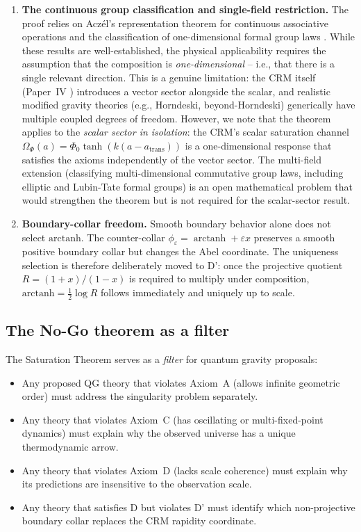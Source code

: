\documentclass[aps,prd,twocolumn,superscriptaddress,nofootinbib]{revtex4-2}
\begin{document}
\begin{enumerate}
\item \textbf{The continuous group classification and single-field restriction.} The proof relies on Acz\'el's representation theorem for continuous associative operations \cite{Aczel1966} and the classification of one-dimensional formal group laws \cite{Hazewinkel1978}. While these results are well-established, the physical applicability requires the assumption that the composition is \textit{one-dimensional} -- i.e., that there is a single relevant direction. This is a genuine limitation: the CRM itself (Paper~IV \cite{Geiger2026d}) introduces a vector sector alongside the scalar, and realistic modified gravity theories (e.g., Horndeski, beyond-Horndeski) generically have multiple coupled degrees of freedom. However, we note that the theorem applies to the \textit{scalar sector in isolation}: the CRM's scalar saturation channel $\Omega_\Phi(a) = \Phi_0 \tanh(k(a - a_{\mathrm{trans}}))$ is a one-dimensional response that satisfies the axioms independently of the vector sector. The multi-field extension (classifying multi-dimensional commutative group laws, including elliptic and Lubin-Tate formal groups) is an open mathematical problem that would strengthen the theorem but is not required for the scalar-sector result.

\item \textbf{Boundary-collar freedom.} Smooth boundary behavior alone does not select $\mathrm{arctanh}$. The counter-collar $\phi_\varepsilon=\operatorname{arctanh}+\varepsilon x$ preserves a smooth positive boundary collar but changes the Abel coordinate. The uniqueness selection is therefore deliberately moved to D': once the projective quotient $R=(1+x)/(1-x)$ is required to multiply under composition, $\mathrm{arctanh}=\frac12\log R$ follows immediately and uniquely up to scale.
\end{enumerate}

\subsection{The No-Go theorem as a filter}

The Saturation Theorem serves as a \textit{filter} for quantum gravity proposals:

\begin{itemize}
\item Any proposed QG theory that violates Axiom~A (allows infinite geometric order) must address the singularity problem separately.
\item Any theory that violates Axiom~C (has oscillating or multi-fixed-point dynamics) must explain why the observed universe has a unique thermodynamic arrow.
\item Any theory that violates Axiom~D (lacks scale coherence) must explain why its predictions are insensitive to the observation scale.
\item Any theory that satisfies D but violates D' must identify which non-projective boundary collar replaces the CRM rapidity coordinate.
\end{itemize}
\end{document}
